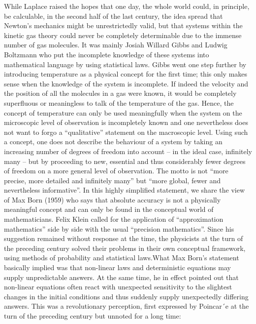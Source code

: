 \documentclass[12pt]{article}
\begin{document}
While Laplace raised the hopes that one day, the whole world could, in principle,
be calculable, in the second half of the last century, the idea spread that Newton’s
mechanics might be unrestrictedly valid, but that systems within the kinetic gas
theory could never be completely determinable due to the immense number of gas
molecules. It was mainly Josiah Willard Gibbs and Ludwig Boltzmann who put
the incomplete knowledge of these systems into mathematical language by using
statistical laws. Gibbs went one step further by introducing temperature as a physical
concept for the first time; this only makes sense when the knowledge of the
system is incomplete. If indeed the velocity and the position of all the molecules in
a gas were known, it would be completely superfluous or meaningless to talk of the
temperature of the gas. Hence, the concept of temperature can only be used meaningfully
when the system on the microscopic level of observation is incompletely
known and one nevertheless does not want to forgo a “qualitative” statement on
the macroscopic level. Using such a concept, one does not describe the behaviour
of a system by taking an increasing number of degrees of freedom into account –
in the ideal case, infinitely many – but by proceeding to new, essential and thus
considerably fewer degrees of freedom on a more general level of observation. The
motto is not “more precise, more detailed and infinitely many” but “more global,
fewer and nevertheless informative”. In this highly simplified statement, we share
the view of Max Born (1959) who says that absolute accuracy is not a physically
meaningful concept and can only be found in the conceptual world of mathematicians.
Felix Klein called for the application of “approximation mathematics” side by
side with the usual “precision mathematics”. Since his suggestion remained without
response at the time, the physicists at the turn of the preceding century solved their
problems in their own conceptual framework, using methods of probability and statistical
laws.What Max Born’s statement basically implied was that non-linear laws
and deterministic equations may supply unpredictable answers. At the same time,
he in effect pointed out that non-linear equations often react with unexpected sensitivity
to the slightest changes in the initial conditions and thus suddenly supply
unexpectedly differing answers. This was a revolutionary perception, first expressed
by Poincar´e at the turn of the preceding century but unnoted for a long time:

\hfill
\end{document}
